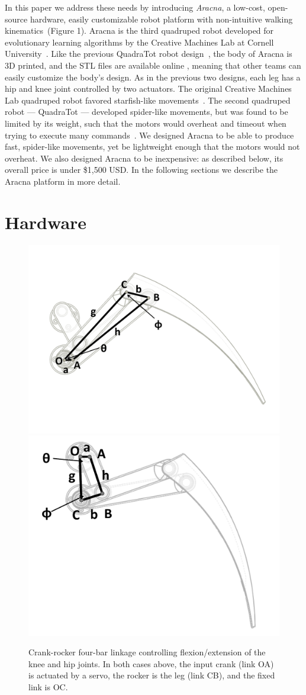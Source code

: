 \documentclass[letterpaper]{article}
\begin{document}
In this paper we address these needs by introducing \emph{Aracna}, a low-cost, open-source hardware, easily customizable robot platform with non-intuitive walking
kinematics~(Figure 1). Aracna is the third quadruped robot developed for evolutionary learning algorithms by the Creative Machines Lab at Cornell University~\citep{HL, JY}. Like the previous QuadraTot robot design~\citep{yosinski2011gaits}, the body of Aracna is 3D printed, and the STL files are available online
, meaning that other teams can easily customize the body's design. As in the previous two designs, each leg has a hip and knee joint controlled by two actuators. The original Creative
Machines Lab quadruped robot favored starfish-like movements~\citep{HL}. The second quadruped robot --- QuadraTot ---
developed spider-like movements, but was found to be limited by its
weight, such that the motors would overheat and timeout when trying to execute many commands~\citep{JY, Glette2012Evolution}. We designed Aracna to be able to produce fast, spider-like movements, yet be lightweight enough that the motors would not overheat. We also designed Aracna to be inexpensive: as described below, its overall price is under \$1,500  USD. In the following sections we describe the Aracna platform in more detail. 




\section{Hardware}

\begin{figure}[t]
\begin{center}
\includegraphics[width=.23\textwidth]{fig3.pdf}
\includegraphics[width=.23\textwidth]{fig4.pdf}
\caption{Crank-rocker four-bar linkage controlling flexion/extension of
  the knee and hip joints. In both cases above, the input crank (link
  OA) is actuated by a servo, the rocker is the leg (link CB), and the
  fixed link is OC.}
\label{fig3}
\end{center}
\end{figure}
\end{document}
